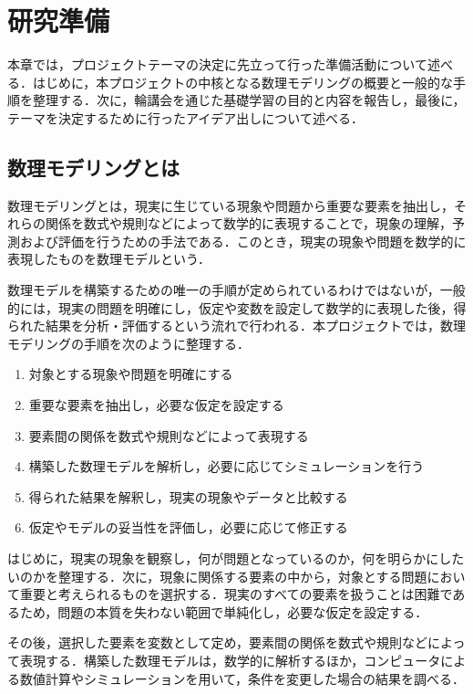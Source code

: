 \chapter{研究準備}
本章では，プロジェクトテーマの決定に先立って行った準備活動について述べる．はじめに，本プロジェクトの中核となる数理モデリングの概要と一般的な手順を整理する．次に，輪講会を通じた基礎学習の目的と内容を報告し，最後に，テーマを決定するために行ったアイデア出しについて述べる．

\section{数理モデリングとは}
数理モデリングとは，現実に生じている現象や問題から重要な要素を抽出し，それらの関係を数式や規則などによって数学的に表現することで，現象の理解，予測および評価を行うための手法である\cite{book:mathmodel}．このとき，現実の現象や問題を数学的に表現したものを数理モデルという．

数理モデルを構築するための唯一の手順が定められているわけではないが，一般的には，現実の問題を明確にし，仮定や変数を設定して数学的に表現した後，得られた結果を分析・評価するという流れで行われる．本プロジェクトでは，数理モデリングの手順を次のように整理する．

\begin{enumerate}
  \item 対象とする現象や問題を明確にする
  \item 重要な要素を抽出し，必要な仮定を設定する
  \item 要素間の関係を数式や規則などによって表現する
  \item 構築した数理モデルを解析し，必要に応じてシミュレーションを行う
  \item 得られた結果を解釈し，現実の現象やデータと比較する
  \item 仮定やモデルの妥当性を評価し，必要に応じて修正する
\end{enumerate}

はじめに，現実の現象を観察し，何が問題となっているのか，何を明らかにしたいのかを整理する．次に，現象に関係する要素の中から，対象とする問題において重要と考えられるものを選択する．現実のすべての要素を扱うことは困難であるため，問題の本質を失わない範囲で単純化し，必要な仮定を設定する．

その後，選択した要素を変数として定め，要素間の関係を数式や規則などによって表現する．構築した数理モデルは，数学的に解析するほか，コンピュータによる数値計算やシミュレーションを用いて，条件を変更した場合の結果を調べる．

